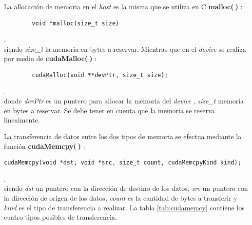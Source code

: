 La allocación de memoria en el \textit{host} es la misma que se utiliza en \textsc{C}  \textbf{malloc($\>$)} :
{\footnotesize
	\begin{frame}{}
		\begin{lstlisting}
		void *malloc(size_t size)
		\end{lstlisting}
		
	\end{frame}
}.
\\
siendo \textit{size\_t} la memoria en bytes a reservar. Mientras que en el \textit{device} se realiza por medio de \textbf{cudaMalloc($\>$)} :
\\
{\footnotesize
\begin{frame}{}
	\begin{lstlisting}
		cudaMalloc(void **devPtr, size_t size);
	\end{lstlisting}

\end{frame}
}.
\\
donde \textit{devPtr} es un puntero para allocar la memoria del \textit{device} , \textit{size\_t} memoria en bytes a reservar. Se debe tener en cuenta que la memoria se reserva linealmente.

La transferencia de datos entre los dos tipos de memoria se efectua mediante la función \textbf{cudaMemcpy($\>$)} :
{\footnotesize
\begin{frame}{}
	\begin{lstlisting}
cudaMemcpy(void *dst, void *src, size_t count, cudaMemcpyKind kind);
	\end{lstlisting}
	
\end{frame}
}.
\\
siendo \textit{dst} un puntero con la dirección de destino de los datos, \textit{src} un puntero con la dirección de origen de los datos, \textit{count} es la cantidad de bytes a transferir y \textit{kind} es el tipo de transferencia a realizar\cite{zone2020cuda}. La tabla \ref{tab:cudamemcy} contiene los cuatro tipos posibles de transferencia.


